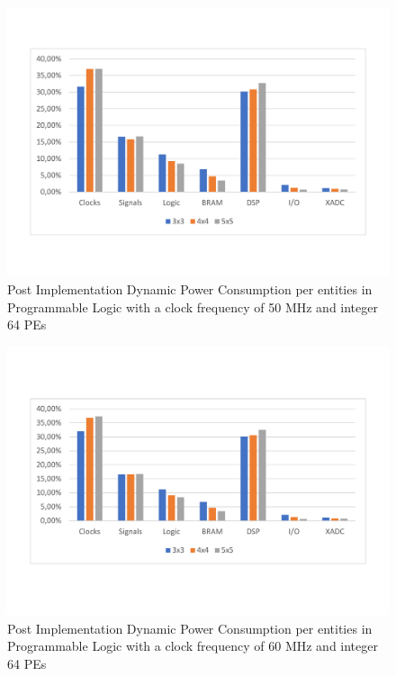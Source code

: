 \begin{figure}[!htbp]
\centering
\captionsetup{justification=centering}
\includegraphics[scale=0.6,angle=0]{./figure/graphs/power_pldyn_div_int64_freq_50mhz.pdf}
\caption{Post Implementation Dynamic Power Consumption per entities in Programmable Logic with a clock frequency of 50 MHz and integer 64 PEs}
\label{fig:dynpowint64ent50}
\end{figure}
\begin{figure}[!htbp]
\centering
\captionsetup{justification=centering}
\includegraphics[scale=0.6,angle=0]{./figure/graphs/power_pldyn_div_int64_freq_60mhz.pdf}
\caption{Post Implementation Dynamic Power Consumption per entities in Programmable Logic with a clock frequency of 60 MHz and integer 64 PEs}
\label{fig:dynpowint64ent60}
\end{figure}

